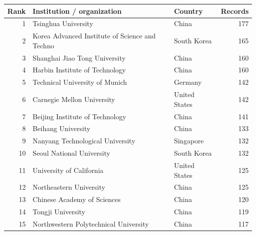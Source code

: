 \begin{tabular}{rllr}
\toprule
Rank & Institution / organization & Country & Records \\
\midrule
1 & Tsinghua University & China & 177 \\
2 & Korea Advanced Institute of Science and Techno & South Korea & 165 \\
3 & Shanghai Jiao Tong University & China & 160 \\
4 & Harbin Institute of Technology & China & 160 \\
5 & Technical University of Munich & Germany & 142 \\
6 & Carnegie Mellon University & United States & 142 \\
7 & Beijing Institute of Technology & China & 141 \\
8 & Beihang University & China & 133 \\
9 & Nanyang Technological University & Singapore & 132 \\
10 & Seoul National University & South Korea & 132 \\
11 & University of California & United States & 125 \\
12 & Northeastern University & China & 125 \\
13 & Chinese Academy of Sciences & China & 120 \\
14 & Tongji University & China & 119 \\
15 & Northwestern Polytechnical University & China & 117 \\
\bottomrule
\end{tabular}
